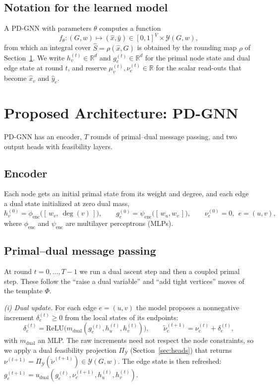 \documentclass[11pt]{article}
\theoremstyle{plain}
\theoremstyle{definition}
\theoremstyle{remark}
\newcommand{\Ycal}{\mathcal{Y}}
\newcommand{\real}{\mathbb{R}}
\newcommand{\PDGNN}{\textsc{PD-GNN}}
\begin{document}
\subsection{Notation for the learned model}
A \PDGNN{} with parameters $\theta$ computes a function
\[
f_\theta:(G,w)\longmapsto (\hat x,\hat y)\in[0,1]^V\times\Ycal(G,w),
\]
from which an integral cover $\hat S=\rho(\hat x,G)$ is obtained by the rounding
map $\rho$ of Section~\ref{sec:arch}. We write $h_v^{(t)}\in\real^d$ and
$g_e^{(t)}\in\real^d$ for the primal node state and dual edge state at round $t$,
and reserve $\mu_v^{(t)},\nu_e^{(t)}\in\real$ for the scalar read-outs that
become $\hat x_v$ and $\hat y_e$.

\section{Proposed Architecture: PD-GNN}\label{sec:arch}
\PDGNN{} has an encoder, $T$ rounds of primal--dual message passing, and two
output heads with feasibility layers.

\subsection{Encoder}
Each node gets an initial primal state from its weight and degree, and each edge
a dual state initialized at zero dual mass,
\[
h_v^{(0)}=\phi_{\mathrm{enc}}\bigl([\,w_v,\ \deg(v)\,]\bigr),\qquad
g_e^{(0)}=\psi_{\mathrm{enc}}\bigl([\,w_u,w_v\,]\bigr),\qquad \nu_e^{(0)}=0,\ \ e=(u,v),
\]
where $\phi_{\mathrm{enc}}$ and $\psi_{\mathrm{enc}}$ are multilayer perceptrons
(MLPs).

\subsection{Primal--dual message passing}
At round $t=0,\dots,T-1$ we run a dual ascent step and then a coupled primal
step. These follow the ``raise a dual variable'' and ``add tight vertices''
moves of the template $\Phi$.

\emph{(i) Dual update.} For each edge $e=(u,v)$ the model proposes a nonnegative
increment $\delta_e^{(t)}\ge 0$ from the local states of its endpoints:
\begin{equation}
\delta_e^{(t)}=\mathrm{ReLU}\!\bigl(m_{\mathrm{dual}}(g_e^{(t)},h_u^{(t)},h_v^{(t)})\bigr),
\qquad \tilde\nu_e^{(t+1)}=\nu_e^{(t)}+\delta_e^{(t)}, \label{eq:dualinc}
\end{equation}
with $m_{\mathrm{dual}}$ an MLP. The raw increments need not respect the node
constraints, so we apply a dual feasibility projection $\Pi_\Ycal$
(Section~\ref{sec:heads}) that returns $\nu^{(t+1)}=\Pi_\Ycal(\tilde\nu^{(t+1)})
\in\Ycal(G,w)$. The edge state is then refreshed:
$g_e^{(t+1)}=u_{\mathrm{dual}}(g_e^{(t)},\nu_e^{(t+1)},h_u^{(t)},h_v^{(t)})$.
\end{document}
